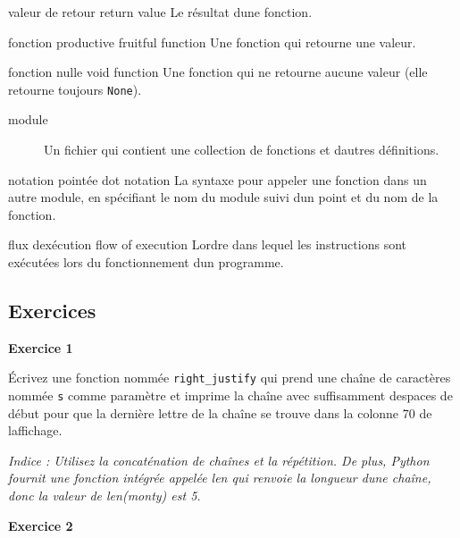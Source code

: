 valeur de retour return value Le résultat d\textquotesingle une
fonction.

fonction productive fruitful function Une fonction qui retourne une
valeur.

fonction nulle void function Une fonction qui ne retourne aucune valeur
(elle retourne toujours \texttt{None}).

\begin{description}
\item[module]
Un fichier qui contient une collection de fonctions et
d\textquotesingle autres définitions.
\end{description}

notation pointée dot notation La syntaxe pour appeler une fonction dans
un autre module, en spécifiant le nom du module suivi
d\textquotesingle un point et du nom de la fonction.

flux d\textquotesingle exécution flow of execution
L\textquotesingle ordre dans lequel les instructions sont exécutées lors
du fonctionnement d\textquotesingle un programme.

\hypertarget{exercices}{%
\subsection{Exercices}\label{exercices}}

\textbf{Exercice 1}

Écrivez une fonction nommée \texttt{right\_justify} qui prend une chaîne
de caractères nommée \texttt{s} comme paramètre et imprime la chaîne
avec suffisamment d\textquotesingle espaces de début pour que la
dernière lettre de la chaîne se trouve dans la colonne 70 de
l\textquotesingle affichage.

\begin{Shaded}
\begin{Highlighting}[]
\OperatorTok{\textgreater{}\textgreater{}\textgreater{}}\NormalTok{)}
\end{Highlighting}
\end{Shaded}

\emph{Indice : Utilisez la concaténation de chaînes et la répétition. De
plus, Python fournit une fonction intégrée appelée len qui renvoie la
longueur d\textquotesingle une chaîne, donc la valeur de
len(\textquotesingle monty\textquotesingle) est 5.}

\textbf{Exercice 2}

